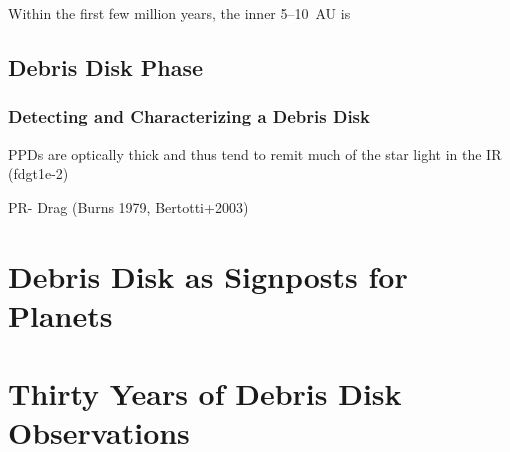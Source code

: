     
    
    Within the first few million years, the inner 5--10~AU is 
    
    
    
     
    
    
    
        
    \subsection{Debris Disk Phase}
    
    \subsubsection{Detecting and Characterizing a Debris Disk}


PPDs are optically thick and thus tend to remit much of the star light in the IR (fdgt1e-2)

PR- Drag (Burns 1979, Bertotti+2003)

    

    
\section{Debris Disk as Signposts for Planets}


\section{Thirty Years of Debris Disk Observations}












